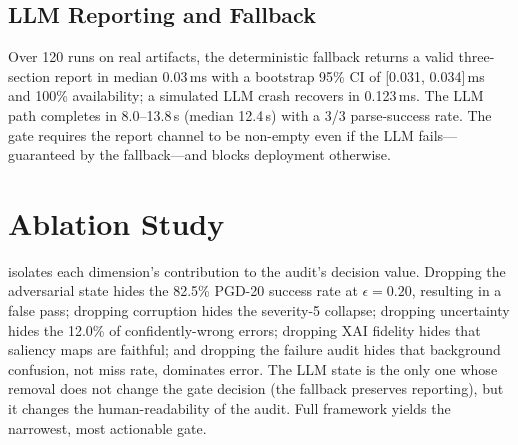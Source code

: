 \documentclass[10pt,twocolumn,letterpaper]{article}
\begin{document}
\subsection{LLM Reporting and Fallback}
Over 120 runs on real artifacts, the deterministic fallback returns a valid three-section report in median 0.03\,ms with a bootstrap 95\% CI of [0.031, 0.034]\,ms and 100\% availability; a simulated LLM crash recovers in 0.123\,ms. The LLM path completes in 8.0--13.8\,s (median 12.4\,s) with a 3/3 parse-success rate. The gate requires the report channel to be non-empty even if the LLM fails---guaranteed by the fallback---and blocks deployment otherwise.


\section{Ablation Study}
\label{sec:ablation}
 isolates each dimension's contribution to the audit's decision value. Dropping the adversarial state hides the 82.5\% PGD-20 success rate at $\epsilon=0.20$, resulting in a false pass; dropping corruption hides the severity-5 collapse; dropping uncertainty hides the 12.0\% of confidently-wrong errors; dropping XAI fidelity hides that saliency maps are faithful; and dropping the failure audit hides that background confusion, not miss rate, dominates error. The LLM state is the only one whose removal does not change the gate decision (the fallback preserves reporting), but it changes the human-readability of the audit. Full framework yields the narrowest, most actionable gate.

\begin{table}[htbp]
\centering
\caption{Quantitative ablation study: impact of removing individual states on deployment gate decisions and key metrics.}
\label{tab:ablation}
\end{table}
\end{document}
